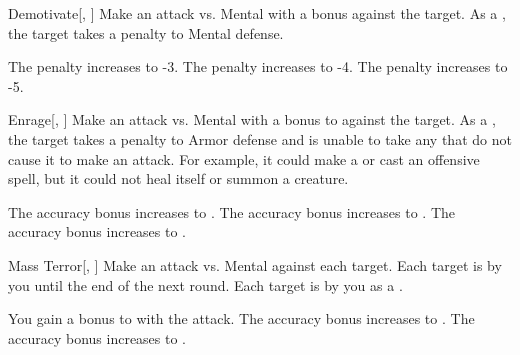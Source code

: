 \lowercase{\hypertarget{spell:Demotivate}{}}\label{spell:Demotivate}
\begin{freeability}[Rank 1]{\hypertarget{spell:Demotivate}{Demotivate}}[, ]
Make an attack vs. Mental with a  bonus against the target.
\hit As a , the target takes a  penalty to Mental defense.

\rankline
{} The penalty increases to -3.
 The penalty increases to -4.
 The penalty increases to -5.
\end{freeability}
\vspace{0.25em}



\lowercase{\hypertarget{spell:Enrage}{}}\label{spell:Enrage}
\begin{freeability}[Rank 1]{\hypertarget{spell:Enrage}{Enrage}}[, ]
Make an attack vs. Mental with a  bonus to  against the target.
\hit As a , the target takes a  penalty to Armor defense and is unable to take any  that do not cause it to make an attack.
For example, it could make a  or cast an offensive spell, but it could not heal itself or summon a creature.

\rankline
{} The accuracy bonus increases to .
 The accuracy bonus increases to .
 The accuracy bonus increases to .
\end{freeability}
\vspace{0.25em}



\lowercase{\hypertarget{spell:Mass Terror}{}}\label{spell:Mass Terror}
\begin{freeability}[Rank 1]{\hypertarget{spell:Mass Terror}{Mass Terror}}[, ]
Make an attack vs. Mental against each target.
\hit Each target is  by you until the end of the next round.
\crit Each target is  by you as a .

\rankline
{} You gain a  bonus to  with the attack.
 The accuracy bonus increases to .
 The accuracy bonus increases to .
\end{freeability}
\vspace{0.25em}



